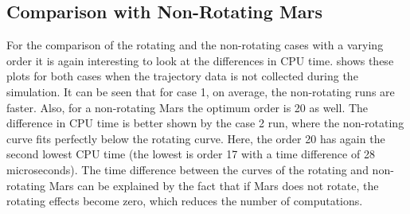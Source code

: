 \subsection{Comparison with Non-Rotating Mars}
\label{subsec:orderCompNotRot}
For the comparison of the rotating and the non-rotating cases with a varying order it is again interesting to look at the differences in CPU time.  shows these plots for both cases when the trajectory data is not collected during the simulation. It can be seen that for case 1, on average, the non-rotating runs are faster. Also, for a non-rotating Mars the optimum order is 20 as well. The difference in CPU time is better shown by the case 2 run, where the non-rotating curve fits perfectly below the rotating curve. Here, the order 20 has again the second lowest CPU time (the lowest is order 17 with a time difference of 28 microseconds). The time difference between the curves of the rotating and non-rotating Mars can be explained by the fact that if Mars does not rotate, the rotating effects become zero, which reduces the number of computations.
%
%
%
%
%


